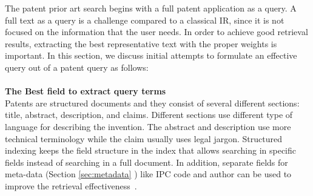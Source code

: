 The patent prior art search begins with a full patent application as a query. A full text as a query is a challenge compared to a classical IR, since it is not focused on the information that the user needs. In order to achieve good retrieval results, extracting the best representative text with the proper weights is important. In this section, we discuss initial attempts to formulate an effective query out of a patent query as follows:
\\\\
\textbf{The Best field to extract query terms}
\ \\
Patents are structured documents and they consist of several different sections: title, abstract, description, and claims. Different sections use different type of language for describing the invention. The abstract and description use more technical terminology while the claim usually uses legal jargon. Structured indexing keeps the field structure in the index that allows searching in specific fields instead of searching in a full document. In addition, separate fields for meta-data (Section \ref{sec:metadata} ) like IPC code and author can be used to improve the retrieval effectiveness~\citep{magdy2010exploring}. 

